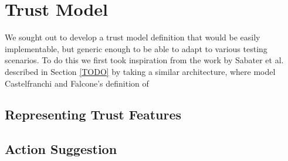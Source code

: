 
\section{Trust Model}
\label{sec:TrustModel}
We sought out to develop a trust model definition that would be easily implementable, but generic enough to be able to adapt to various testing scenarios. To do this we first took inspiration from the work by Sabater et al.\cite{Sabater2006} described in Section \ref{TODO} by taking a similar architecture, where model  Castelfranchi and Falcone's definition of  


% 

\subsection{Representing Trust Features}

\subsection{Action Suggestion}
% 

